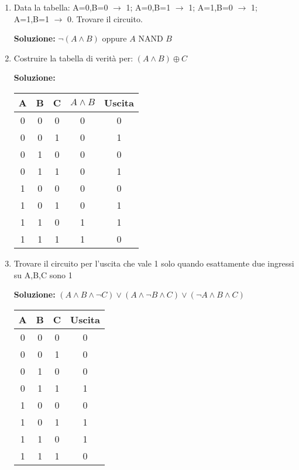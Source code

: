 \documentclass[12pt,a4paper]{article}
\begin{document}
\begin{enumerate}
    \item Data la tabella: A=0,B=0 $\to$ 1; A=0,B=1 $\to$ 1; A=1,B=0 $\to$ 1; A=1,B=1 $\to$ 0. Trovare il circuito.
    
    \textbf{Soluzione:} $\lnot(A \land B)$ oppure $A \text{ NAND } B$

    \item Costruire la tabella di verità per: $(A \land B) \oplus C$
    
    \textbf{Soluzione:}
    \begin{center}
    \begin{tabular}{|c|c|c||c|c|}
    \hline
    A & B & C & $A \land B$ & Uscita \\
    \hline
    0 & 0 & 0 & 0 & 0 \\
    0 & 0 & 1 & 0 & 1 \\
    0 & 1 & 0 & 0 & 0 \\
    0 & 1 & 1 & 0 & 1 \\
    1 & 0 & 0 & 0 & 0 \\
    1 & 0 & 1 & 0 & 1 \\
    1 & 1 & 0 & 1 & 1 \\
    1 & 1 & 1 & 1 & 0 \\
    \hline
    \end{tabular}
    \end{center}

    \item Trovare il circuito per l'uscita che vale 1 solo quando esattamente due ingressi su A,B,C sono 1
    
    \textbf{Soluzione:} $(A \land B \land \lnot C) \lor (A \land \lnot B \land C) \lor (\lnot A \land B \land C)$
    
    \begin{center}
    \begin{tabular}{|c|c|c||c|}
    \hline
    A & B & C & Uscita \\
    \hline
    0 & 0 & 0 & 0 \\
    0 & 0 & 1 & 0 \\
    0 & 1 & 0 & 0 \\
    0 & 1 & 1 & 1 \\
    1 & 0 & 0 & 0 \\
    1 & 0 & 1 & 1 \\
    1 & 1 & 0 & 1 \\
    1 & 1 & 1 & 0 \\
    \hline
    \end{tabular}
    \end{center}

\end{enumerate}
\end{document}
